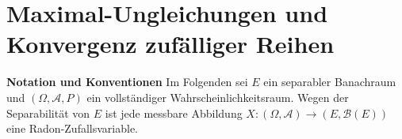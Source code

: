 \chapter{Maximal-Ungleichungen und Konvergenz zufälliger Reihen}
\textbf{Notation und Konventionen}\newline 
Im Folgenden sei $E$ ein separabler Banachraum und $(\Omega, \mathcal{A}, P)$ ein vollständiger Wahrscheinlichkeitsraum. Wegen der Separabilität von $E$ ist jede messbare Abbildung $X: (\Omega, \mathcal{A}) \to (E, \mathcal{B}(E))$ eine Radon-Zufallsvariable. 


\newpage



